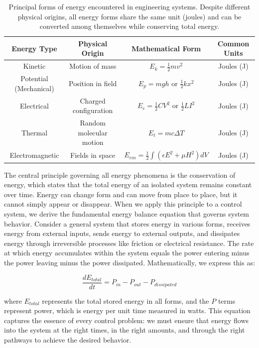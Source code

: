 \begin{table}[htbp]
\centering
\renewcommand{\arraystretch}{1.5}
\begin{tabular}{|c|c|c|c|}
\hline
\textcolor{UofSCGarnet}{\textbf{Energy Type}} &
\textcolor{UofSCGarnet}{\textbf{Physical Origin}} &
\textcolor{UofSCGarnet}{\textbf{Mathematical Form}} &
\textcolor{UofSCGarnet}{\textbf{Common Units}} \\
\hline
Kinetic & Motion of mass & $E_k = \frac{1}{2}mv^2$ & Joules (J) \\
\hline
Potential (Mechanical) & Position in field & $E_p = mgh$ or $\frac{1}{2}kx^2$ & Joules (J) \\
\hline
Electrical & Charged configuration & $E_e = \frac{1}{2}CV^2$ or $\frac{1}{2}LI^2$ & Joules (J) \\
\hline
Thermal & Random molecular motion & $E_t = mc\Delta T$ & Joules (J) \\
\hline
Electromagnetic & Fields in space & $E_{em} = \frac{1}{2}\int(\epsilon E^2 + \mu H^2)dV$ & Joules (J) \\
\hline
\end{tabular}
\caption{Principal forms of energy encountered in engineering systems. Despite different physical origins, all energy forms share the same unit (joules) and can be converted among themselves while conserving total energy.}
\end{table}

The central principle governing all energy phenomena is the conservation of energy, which states that the total energy of an isolated system remains constant over time. Energy can change form and can move from place to place, but it cannot simply appear or disappear. When we apply this principle to a control system, we derive the fundamental energy balance equation that governs system behavior. Consider a general system that stores energy in various forms, receives energy from external inputs, sends energy to external outputs, and dissipates energy through irreversible processes like friction or electrical resistance. The rate at which energy accumulates within the system equals the power entering minus the power leaving minus the power dissipated. Mathematically, we express this as:

$$\frac{dE_{total}}{dt} = P_{in} - P_{out} - P_{dissipated}$$

where $E_{total}$ represents the total stored energy in all forms, and the $P$ terms represent power, which is energy per unit time measured in watts. This equation captures the essence of every control problem: we must ensure that energy flows into the system at the right times, in the right amounts, and through the right pathways to achieve the desired behavior.

